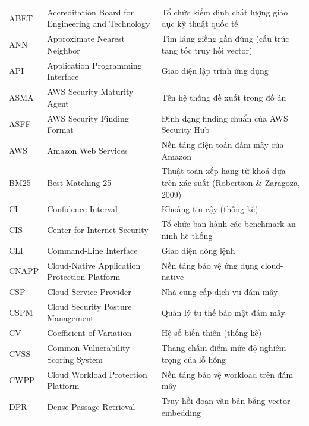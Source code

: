 \begin{longtable}{p{2.2cm} p{5.6cm} p{6.4cm}}
  ABET    & Accreditation Board for Engineering and Technology       & Tổ chức kiểm định chất lượng giáo dục kỹ thuật quốc tế \\
  ANN     & Approximate Nearest Neighbor                              & Tìm láng giềng gần đúng (cấu trúc tăng tốc truy hồi vector) \\
  API     & Application Programming Interface                         & Giao diện lập trình ứng dụng \\
  ASMA    & AWS Security Maturity Agent                               & Tên hệ thống đề xuất trong đồ án \\
  ASFF    & AWS Security Finding Format                               & Định dạng finding chuẩn của AWS Security Hub \\
  AWS     & Amazon Web Services                                       & Nền tảng điện toán đám mây của Amazon \\
  BM25    & Best Matching 25                                          & Thuật toán xếp hạng từ khoá dựa trên xác suất (Robertson \& Zaragoza, 2009) \\
  CI      & Confidence Interval                                       & Khoảng tin cậy (thống kê) \\
  CIS     & Center for Internet Security                              & Tổ chức ban hành các benchmark an ninh hệ thống \\
  CLI     & Command-Line Interface                                    & Giao diện dòng lệnh \\
  CNAPP   & Cloud-Native Application Protection Platform              & Nền tảng bảo vệ ứng dụng cloud-native \\
  CSP     & Cloud Service Provider                                    & Nhà cung cấp dịch vụ đám mây \\
  CSPM    & Cloud Security Posture Management                         & Quản lý tư thế bảo mật đám mây \\
  CV      & Coefficient of Variation                                  & Hệ số biến thiên (thống kê) \\
  CVSS    & Common Vulnerability Scoring System                       & Thang chấm điểm mức độ nghiêm trọng của lỗ hổng \\
  CWPP    & Cloud Workload Protection Platform                        & Nền tảng bảo vệ workload trên đám mây \\
  DPR     & Dense Passage Retrieval                                   & Truy hồi đoạn văn bản bằng vector embedding \\

\end{longtable}

